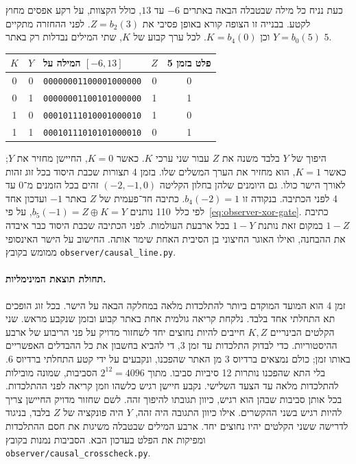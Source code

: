 \documentclass[11pt,a4paper]{article}
\DeclareRobustCommand{\textenglish}[1]{\foreignlanguage{english}{#1}}
\theoremstyle{definition}
\begin{document}
כעת נניח כל מילה שבטבלה הבאה באתרים $-6$ עד $13$, כולל הקצוות, על רקע אפסים מחוץ לקטע. בבנייה זו הצופה קורא באופן פסיבי את $Z=b_2(3)$. לפני ההחזרה מתקיים $Y=b_0(5)$ וכן $K=b_4(0)$. לכל ערך קבוע של $K$, שתי המילים נבדלות רק באתר $5$.

\begin{center}
\begin{tabular}{cc l cc}
$K$ & $Y$ & המילה על $[-6,13]$ & $Z$ & פלט בזמן 5 \\
\hline
0 & 0 & \textenglish{\texttt{00000001100001000000}} & 0 & 0 \\
0 & 1 & \textenglish{\texttt{00000001100101000000}} & 1 & 1 \\
1 & 0 & \textenglish{\texttt{00010111010001000010}} & 1 & 0 \\
1 & 1 & \textenglish{\texttt{00010111010101000010}} & 0 & 1
\end{tabular}
\end{center}

היפוך של $Y$ בלבד משנה את $Z$ עבור שני ערכי $K$. כאשר $K=0$, החיישן מחזיר את $Y$; כאשר $K=1$, הוא מחזיר את הערך המשלים שלו. בזמן 4 תצורות שכבת היסוד בכל זוג זהות לאורך הישר כולו. גם היומנים שלהן בחלון הקליטה $(-2,-1,0)$ זהים בכל הזמנים מ־0 עד 4 לפני הכתיבה. בנקודה זו $b_4(-2)=1$. כתיבה חד־פעמית של $Z$ באתר $-1$ ועדכון אחד לפי כלל~110 נותנים $b_5(-1)=Z\oplus K=Y$, על פי~\eqref{eq:observer-xor-gate}. כתיבת $1-Z$ במקום זאת נותנת $1-Y$ בכל ארבעת העולמות. לפני הכתיבה שכבת היסוד כבר איבדה את ההבחנה, ואילו האוגר החיצוני בן הסיבית האחת שימר אותה. החישוב על הישר האינסופי ממומש בקובץ \textenglish{\nolinkurl{observer/causal_line.py}}.

\paragraph{תחולת תוצאת המינימליות.}
זמן 4 הוא המועד המוקדם ביותר להתלכדות מלאה במחלקה הבאה על הישר. בכל זוג הופכים תא התחלתי אחד בלבד. נלקחת קריאה גולמית אחת באתר קבוע ובזמן שנקבע מראש. שני הקלטים הבינריים $K,Z$ חייבים להיות נחוצים יחד לשחזור מדויק על פני הריבוע של ארבע ההיסטוריות. כדי לבדוק התלכדות עד זמן 3, די להביא בחשבון את כל ההבדלים האפשריים באותו זמן; כולם נמצאים ברדיוס 3 מן האתר שהפכנו, ונקבעים על ידי קטע התחלתי ברדיוס 6. בלי התא שהפכנו נותרות 12 סיביות סביבו. מתוך $2^{12}=4096$ הסביבות, שמונה מובילות להתלכדות מלאה עד הצעד השלישי. נקבע חיישן רגיש כלשהו וזמן קריאה לפני ההתלכדות. בכל אותן סביבות שבהן הוא רגיש, כיוון תגובתו להיפוך זהה. לשם שחזור מדויק החיישן צריך להיות רגיש בשני ההקשרים. אילו כיוון התגובה היה זהה, $Y$ היה פונקציה של $Z$ בלבד, בניגוד לדרישה ששני הקלטים יהיו נחוצים יחד. ארבע המילים שבטבלה משיגות את חסם ההתלכדות ומפיקות את הפלט בעדכון הבא. הסביבות נמנות בקובץ \textenglish{\nolinkurl{observer/causal_crosscheck.py}}.
\end{document}
